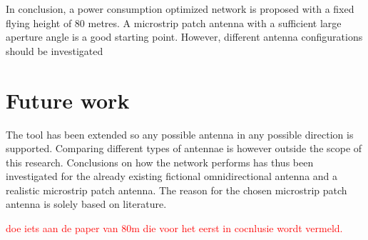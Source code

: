 In conclusion, a power consumption optimized network is proposed with a fixed flying height of 80 metres. A microstrip patch 
antenna with a sufficient large aperture angle is a good starting point. However, different antenna configurations should 
be investigated 

\section{Future work}
The tool has been extended so any possible antenna in any possible direction is supported. Comparing different types 
of antennae is however outside the scope of this research.
Conclusions on how the network performs has thus been investigated for the already existing fictional omnidirectional antenna and a 
realistic microstrip patch antenna. The reason for the chosen microstrip patch antenna is solely based on literature.

\textcolor{red}{doe iets aan de paper van 80m die voor het eerst in cocnlusie wordt vermeld.}